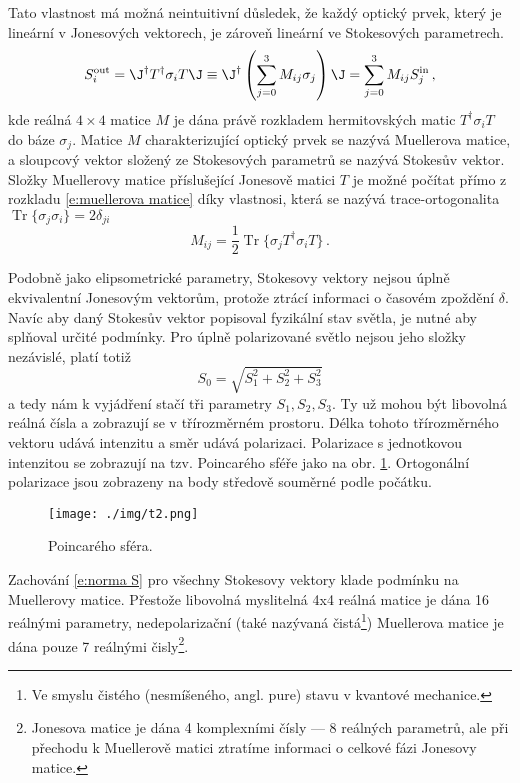 Tato vlastnost má možná neintuitivní důsledek, že každý optický prvek, který je lineární v Jonesových vektorech, je zároveň lineární ve Stokesových parametrech.
\begin{equation} \label{e:muellerova matice}
S^\textrm{out}_i=\J^\dagger T^\dagger \sigma_i T \J\equiv\J^\dagger \left(\sum_{j=0}^{3} M_{ij} \sigma_j \right) \J=\sum_{j=0}^{3} M_{ij} S^\textrm{in}_j \,,
\end{equation}
kde reálná $4\times 4$ matice $M$ je dána právě rozkladem hermitovských matic $T^\dagger \sigma_i T$ do báze $\sigma_j$. 
Matice $M$ charakterizující optický prvek se nazývá Muellerova matice, a sloupcový vektor složený ze Stokesových parametrů se nazývá Stokesův vektor.
Složky Muellerovy matice příslušející Jonesově matici $T$ je možné počítat přímo z rozkladu \eqref{e:muellerova matice} díky vlastnosi, která se nazývá trace-ortogonalita $\operatorname{Tr}\lbrace\sigma_j\sigma_i\rbrace=2\delta_{ji}$
\begin{equation} \label{e:mueller rozklad}
M_{ij}=\frac{1}{2}\operatorname{Tr}\lbrace \sigma_j T^\dagger \sigma_i T \rbrace \,.
\end{equation}

Podobně jako elipsometrické parametry, Stokesovy vektory nejsou úplně ekvivalentní Jonesovým vektorům, protože ztrácí informaci o časovém zpoždění $\delta$.
Navíc aby daný Stokesův vektor popisoval fyzikální stav světla, je nutné aby splňoval určité podmínky. 
Pro úplně polarizované světlo nejsou jeho složky nezávislé, platí totiž
\begin{equation} \label{e:norma S}
S_0=\sqrt{S_1^2+S_2^2+S_3^2}
\end{equation}
a tedy nám k vyjádření stačí tři parametry $S_1, S_2, S_3$.
Ty už mohou být libovolná reálná čísla a zobrazují se v třírozměrném prostoru.
Délka tohoto třírozměrného vektoru udává intenzitu a směr udává polarizaci.
Polarizace s jednotkovou intenzitou se zobrazují na tzv. Poincarého sféře jako na obr. \ref{f:poincareho sfera}.
Ortogonální polarizace jsou zobrazeny na body středově souměrné podle počátku.

\begin{figure}
\texttt{[image: ./img/t2.png]}\centering
\caption{Poincarého sféra.}\label{f:poincareho sfera}
\end{figure}

Zachování \eqref{e:norma S} pro všechny Stokesovy vektory klade podmínku na Muellerovy matice.
Přestože libovolná myslitelná 4x4 reálná matice je dána 16 reálnými parametry, nedepolarizační (také nazývaná čistá\footnote{Ve smyslu čistého (nesmíšeného, angl. pure) stavu v kvantové mechanice.}) Muellerova matice je dána pouze 7 reálnými čisly\footnote{Jonesova matice je dána 4 komplexními čísly --- 8 reálných parametrů, ale při přechodu k Muellerově matici ztratíme informaci o celkové fázi Jonesovy matice.}. \cite{Muellerdiff}

